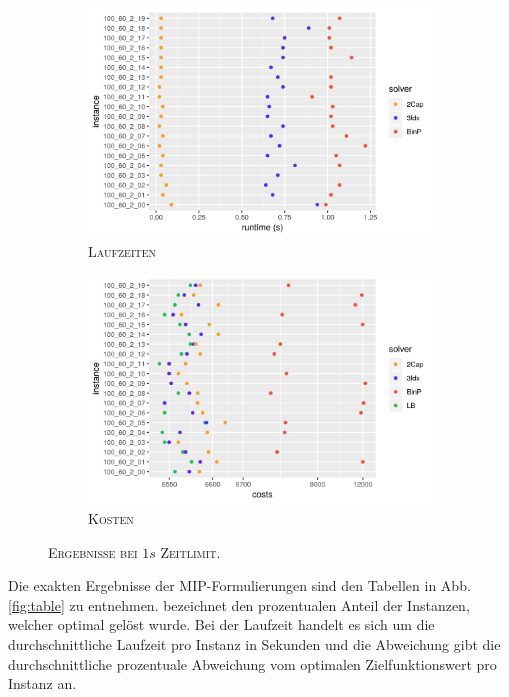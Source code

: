 \vfill
\pagebreak

\begin{figure}[H]
\centering
\begin{subfigure}[b]{0.47\textwidth}
\centering
\includegraphics[width=1.1\textwidth]{img/solver_instance_time_b=2_s_1s.png}
\caption{\textsc{Laufzeiten}}
\label{fig:b=2_s_runtimes}
\end{subfigure}
\hfill
\begin{subfigure}[b]{0.47\textwidth}
\centering
\includegraphics[width=1.1\textwidth]{img/solver_instance_cost_b=2_s_1s.png}
\caption{\textsc{Kosten}}
\label{fig:b=2_s_costs}
\end{subfigure}
\caption{\textsc{Ergebnisse bei $1s$ Zeitlimit}.}
\label{fig:b=2_s_results}
\end{figure}

Die exakten Ergebnisse der MIP-Formulierungen sind den Tabellen in Abb. \ref{fig:table} zu entnehmen.
 bezeichnet den prozentualen Anteil der Instanzen, welcher optimal gelöst wurde.
Bei der Laufzeit handelt es sich um die durchschnittliche Laufzeit pro Instanz in Sekunden und die
Abweichung gibt die durchschnittliche prozentuale Abweichung vom optimalen Zielfunktionswert pro Instanz an.

